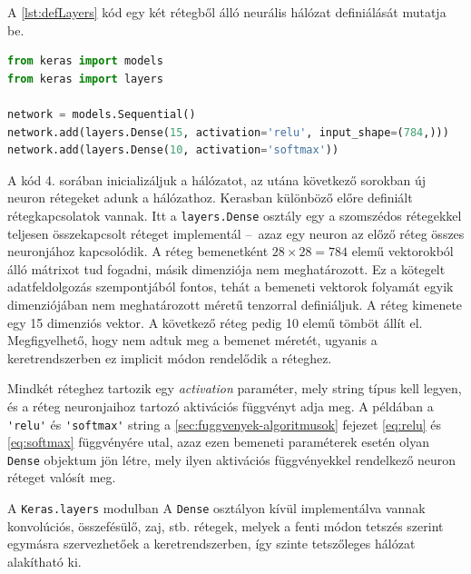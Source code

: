 A \ref{lst:defLayers} kód egy két rétegből álló neurális hálózat definiálását mutatja be.
\begin{minipage}{\textwidth}
\begin{lstlisting}[language=Python, caption=Neurális hálózat rétegeinek definiálása]
from keras import models
from keras import layers

network = models.Sequential()
network.add(layers.Dense(15, activation='relu', input_shape=(784,)))
network.add(layers.Dense(10, activation='softmax'))
\end{lstlisting}\label{lst:defLayers}
\end{minipage}
A kód 4. sorában inicializáljuk a hálózatot, az utána következő sorokban új neuron rétegeket adunk a hálózathoz. Kerasban különböző előre definiált rétegkapcsolatok vannak. Itt a \verb|layers.Dense| osztály egy a szomszédos rétegekkel teljesen összekapcsolt réteget implementál --~azaz egy neuron az előző réteg összes neuronjához kapcsolódik.
A réteg bemenetként $28 \times 28 = 784$ elemű vektorokból álló mátrixot tud fogadni, másik dimenziója nem meghatározott. Ez a kötegelt adatfeldolgozás szempontjából fontos, tehát a bemeneti vektorok folyamát egyik dimenziójában nem meghatározott méretű tenzorral definiáljuk. A réteg kimenete egy 15 dimenziós vektor. A következő réteg pedig 10 elemű tömböt állít el. Megfigyelhető, hogy nem adtuk meg a bemenet méretét, ugyanis a keretrendszerben ez implicit módon rendelődik a réteghez. 

Mindkét réteghez tartozik egy \emph{activation} paraméter, mely string típus kell legyen, és a réteg neuronjaihoz tartozó aktivációs függvényt adja meg. A példában a \verb|'relu'| és \verb|'softmax'| string a \ref{sec:fuggvenyek-algoritmusok} fejezet \eqref{eq:relu} és \eqref{eq:softmax} függvényére utal, azaz ezen bemeneti paraméterek esetén olyan \verb|Dense| objektum jön létre, mely ilyen aktivációs függvényekkel rendelkező neuron réteget valósít meg.

A \verb|Keras.layers| modulban A \verb|Dense| osztályon kívül implementálva vannak konvolúciós, összefésülő, zaj, stb. rétegek, melyek a fenti módon tetszés szerint egymásra szervezhetőek a keretrendszerben, így szinte tetszőleges hálózat alakítható ki.

